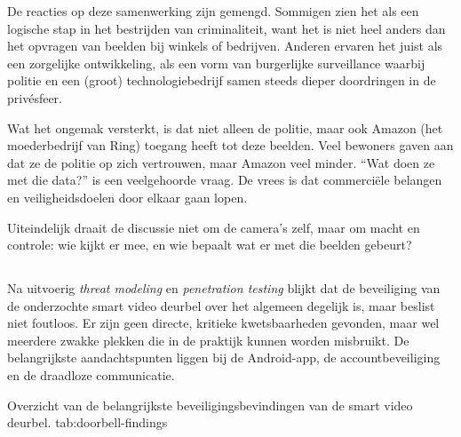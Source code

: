 \documentclass[nonacm,sigconf]{acmart}
\begin{document}
    De reacties op deze samenwerking zijn gemengd.
    Sommigen zien het als een logische stap in het bestrijden van criminaliteit, want het is niet heel anders dan het opvragen van beelden bij winkels of bedrijven.
    Anderen ervaren het juist als een zorgelijke ontwikkeling, als een vorm van burgerlijke surveillance waarbij politie en een (groot) technologiebedrijf samen steeds dieper doordringen in de privésfeer.

    Wat het ongemak versterkt, is dat niet alleen de politie, maar ook Amazon (het moederbedrijf van Ring) toegang heeft tot deze beelden.
    Veel bewoners gaven aan dat ze de politie op zich vertrouwen, maar Amazon veel minder. “Wat doen ze met die data?” is een veelgehoorde vraag.
    De vrees is dat commerciële belangen en veiligheidsdoelen door elkaar gaan lopen.

    Uiteindelijk draait de discussie niet om de camera’s zelf, maar om macht en controle: wie kijkt er mee, en wie bepaalt wat er met die beelden gebeurt?

    \subsection{}
    \parencite{liu2021ethical}

    Na uitvoerig \textit{threat modeling} en \textit{penetration testing} blijkt dat de beveiliging van de onderzochte smart video deurbel over het algemeen degelijk is, maar beslist niet foutloos. Er zijn geen directe, kritieke kwetsbaarheden gevonden, maar wel meerdere zwakke plekken die in de praktijk kunnen worden misbruikt. De belangrijkste aandachtspunten liggen bij de Android-app, de accountbeveiliging en de draadloze communicatie.

    \SimpleTable
    {Overzicht van de belangrijkste beveiligingsbevindingen van de smart video deurbel.}
    {tab:doorbell-findings}
    {
    }
\end{document}

